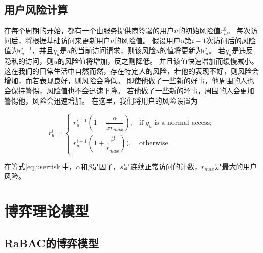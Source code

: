 \subsection{用户风险计算}

在每个周期的开始，都有一个由服务提供商签署的用户${u}$的初始风险值${r_u ^ 0}$。 每次访问后，将根据基础访问来更新用户${u}$的风险值。 假设用户${u}$第${{i-1}}$次访问后的风险值为${r_u ^ {i-1}}$，并且${q_u}$是${u}$的当前访问请求，则该风险$ {u}$的值将更新为${r_u ^ {i}}$。 若${q_u}$是违反隐私的访问，则${u}$的风险值将增加，反之则降低。 并且该值快速增加而缓慢减小。 这在我们的日常生活中自然而然，存在特定人的风险，若他的表现不好，则风险会增加，而若表现良好，则风险会降低。 即使他做了一些新的好事，他周围的人也会保持警惕，风险值也不会迅速下降。 若他做了一些新的坏事，周围的人会更加警惕他，风险会迅速增加。 在这里，我们将用户的风险设置为

\begin{equation}\label{eq:userrisk}
r_u^{i}=\left\{ 
\begin{array}{cl}
r_u^{i-1}(1-\dfrac{\alpha}{xr_{max}}), & \text{if } q_u \text{ is a normal access;}\\
r_u^{i-1}(1+\dfrac{\beta}{r_{max}})), & \text{otherwise.}
\end{array}
\right.
\end{equation}

在等式\ref{eq:userrisk}中，$\alpha$和$\beta$是因子，$s$是连续正常访问的计数，$r_{max}$是最大的用户风险。

\section{博弈理论模型}
\label{sec:gamemodel}

\subsection{RaBAC的博弈模型}

